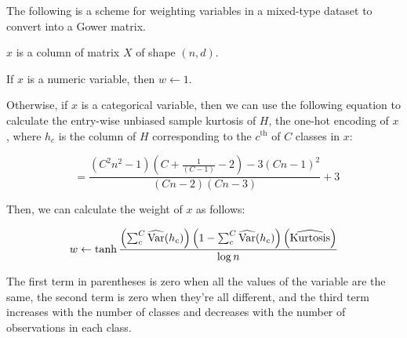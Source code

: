 \documentclass[11pt]{article}
\DeclareMathOperator{\Var}{\widehat{Var}}
\DeclareMathOperator{\Kurt}{\widehat{Kurtosis}}
\begin{document}
    The following is a scheme for weighting variables in a mixed-type dataset to convert into a Gower
    matrix.

    $x$ is a column of matrix $X$ of shape $\left(n,d\right)$.

    If $x$ is a numeric variable, then $w\leftarrow1$.

    Otherwise, if $x$ is a categorical variable, then we can use the following equation to calculate the entry-wise
    unbiased sample kurtosis of $H$, the one-hot encoding of $x$, where $h_c$ is the column of $H$ corresponding to the
    $c^{\text{th}}$ of $C$ classes in $x$:

    \begin{equation}
        \Kurt=\frac{(C^2n^2-1)(C+\frac{1}{(C-1)}-2)-3(Cn-1)^2}{(Cn-2)(Cn-3)}+3 \label{eq:kurtosis}
    \end{equation}

    Then, we can calculate the weight of $x$ as follows:

    \begin{equation}
        w\leftarrow\tanh{\frac{
        \left(\sum_c^C{\Var(h_c)}\right)
        \left(1-\sum_c^C{\Var(h_c)}\right)
        \Bigl(\Kurt\Bigr)}{\log{n}}}
        \label{eq:equation}
    \end{equation}



    The first term in parentheses is zero when all the values of the variable are the same, the second term is zero when
    they're all different, and the third term increases with the number of classes and decreases with the number of
    observations in each class.
\end{document}

